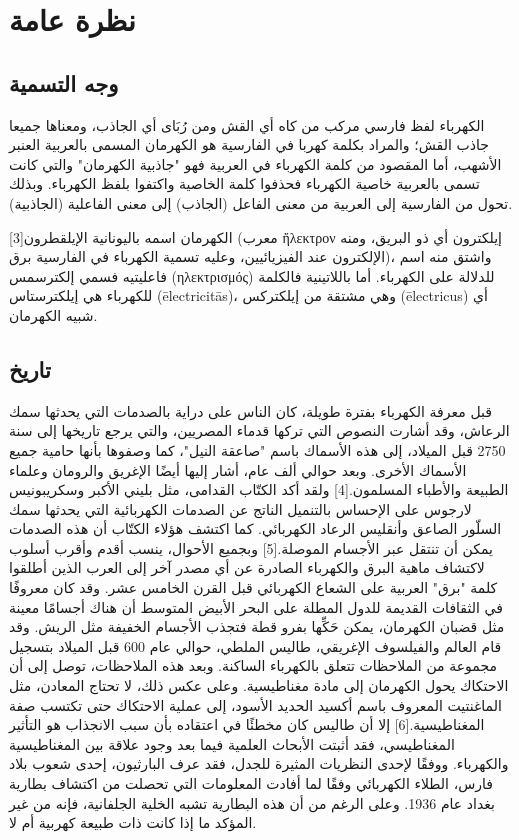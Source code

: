 \documentclass[a4paper]{book}
\begin{document}
\mainmatter

\chapter{نظرة عامة}

\section{وجه التسمية}

الكهرباء لفظ فارسي مركب من کاه أي القش ومن رُبَای أي الجاذب، ومعناها
جميعا جاذب القش؛ والمراد بكلمة کهربا في الفارسية هو الكهرمان المسمى
بالعربية العنبر الأشهب، أما المقصود من كلمة الكهرباء في العربية فهو
"جاذبية الكهرمان" والتي كانت تسمى بالعربية خاصية الكهرباء فحذفوا كلمة
الخاصية واكتفوا بلفظ الكهرباء. وبذلك تحول من الفارسية إلى العربية من
معنى الفاعل (الجاذب) إلى معنى الفاعلية (الجاذبية).

الكهرمان اسمه باليونانية الإيلقطرون[3] (معرب ἤλεκτρον إيلكترون أي ذو
البريق، ومنه الإلكترون عند الفيزيائيين، وعليه تسمية الكهرباء في
الفارسية برق)، واشتق منه اسم فاعليتيه فسمي إلكترسمس (ηλεκτρ‌ισμός)
للدلالة على الكهرباء. أما باللاتينية فالكلمة للكهرباء هي إيلكترستاس
(ēlectricitās)، وهي مشتقة من إيلكتركس (ēlectricus) أي شبيه الكهرمان.

\section{تاريخ}

قبل معرفة الكهرباء بفترة طويلة، كان الناس على دراية بالصدمات التي
يحدثها سمك الرعاش، وقد أشارت النصوص التي تركها قدماء المصريين، والتي
يرجع تاريخها إلى سنة 2750 قبل الميلاد، إلى هذه الأسماك باسم "صاعقة
النيل"، كما وصفوها بأنها حامية جميع الأسماك الأخرى. وبعد حوالي ألف
عام، أشار إليها أيضًا الإغريق والرومان وعلماء الطبيعة والأطباء
المسلمون.[4] ولقد أكد الكتّاب القدامى، مثل بليني الأكبر وسكريبونيس
لارجوس على الإحساس بالتنميل الناتج عن الصدمات الكهربائية التي يحدثها
سمك السلّور الصاعق وأنقليس الرعاد الكهربائي. كما اكتشف هؤلاء الكتّاب أن
هذه الصدمات يمكن أن تنتقل عبر الأجسام الموصلة.[5] وبجميع الأحوال، ينسب
أقدم وأقرب أسلوب لاكتشاف ماهية البرق والكهرباء الصادرة عن أي مصدر آخر
إلى العرب الذين أطلقوا كلمة "برق" العربية على الشعاع الكهربائي قبل
القرن الخامس عشر. وقد كان معروفًا في الثقافات القديمة للدول المطلة على
البحر الأبيض المتوسط أن هناك أجسامًا معينة مثل قضبان الكهرمان، يمكن
حَكِّها بفرو قطة فتجذب الأجسام الخفيفة مثل الريش. وقد قام العالم
والفيلسوف الإغريقي، طاليس الملطي، حوالي عام 600 قبل الميلاد بتسجيل
مجموعة من الملاحظات تتعلق بالكهرباء الساكنة. وبعد هذه الملاحظات، توصل
إلى أن الاحتكاك يحول الكهرمان إلى مادة مغناطيسية. وعلى عكس ذلك، لا
تحتاج المعادن، مثل الماغنتيت المعروف باسم أكسيد الحديد الأسود، إلى
عملية الاحتكاك حتى تكتسب صفة المغناطيسية.[6] إلا أن طاليس كان مخطئًا في
اعتقاده بأن سبب الانجذاب هو التأثير المغناطيسي، فقد أثبتت الأبحاث
العلمية فيما بعد وجود علاقة بين المغناطيسية والكهرباء. ووفقًا لإحدى
النظريات المثيرة للجدل، فقد عرف البارثيون، إحدى شعوب بلاد فارس، الطلاء
الكهربائي وفقًا لما أفادت المعلومات التي تحصلت من اكتشاف بطارية بغداد
عام 1936. وعلى الرغم من أن هذه البطارية تشبه الخلية الجلفانية، فإنه من
غير المؤكد ما إذا كانت ذات طبيعة كهربية أم لا.
\end{document}
